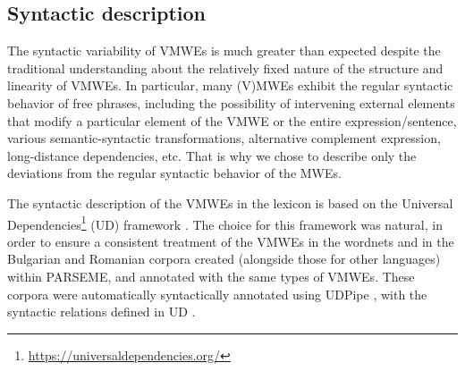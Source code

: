 \documentclass[output=paper,colorlinks,citecolor=brown]{langscibook}
\begin{document}
\subsection{Syntactic description} 
The syntactic variability of VMWEs is much greater than expected despite the traditional understanding about the relatively fixed nature of the structure and linearity of VMWEs. In particular, many (V)MWEs exhibit the regular syntactic behavior of free phrases, including the possibility of intervening external elements that modify a particular element of the VMWE or the entire expression/sentence, various semantic-syntactic transformations, alternative complement expression, long-distance dependencies, etc. That is why we chose to describe only the deviations from the regular syntactic behavior of the MWEs.%

The syntactic description of the VMWEs in the lexicon is based on the Universal Dependencies\footnote{\url{https://universaldependencies.org/}} (UD) framework \citep{UD}. The choice for this framework was natural, in order to ensure a consistent treatment of the VMWEs in the wordnets and in the Bulgarian \citep{Savary-et-al2018} and Romanian \citep{barbu-mititelu-etal-2019-romanian} corpora created (alongside those for other languages) within PARSEME, and annotated with the same types of VMWEs. These corpora were automatically syntactically annotated  using UDPipe \citep{udpipe}, with the syntactic relations defined in UD \citep{savary-etal-2023-parseme}. 
\end{document}
